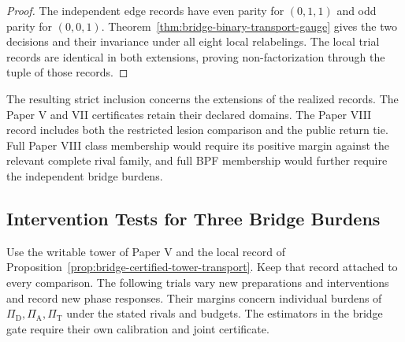 \documentclass[11pt,a4paper]{article}
\theoremstyle{definition}
\newcommand{\PiD}{\Pi_{\mathrm{D}}}
\newcommand{\PiA}{\Pi_{\mathrm{A}}}
\newcommand{\PiT}{\Pi_{\mathrm{T}}}
\begin{document}
\begin{proof}
The independent edge records have even parity for $(0,1,1)$ and odd parity for $(0,0,1)$. Theorem~\ref{thm:bridge-binary-transport-gauge} gives the two decisions and their invariance under all eight local relabelings. The local trial records are identical in both extensions, proving non-factorization through the tuple of those records.
\end{proof}

The resulting strict inclusion concerns the extensions of the realized records. The Paper V and VII certificates retain their declared domains. The Paper VIII record includes both the restricted lesion comparison and the public return tie. Full Paper VIII class membership would require its positive margin against the relevant complete rival family, and full BPF membership would further require the independent bridge burdens.

\subsection{Intervention Tests for Three Bridge Burdens}

Use the writable tower of Paper V and the local record of Proposition~\ref{prop:bridge-certified-tower-transport}. Keep that record attached to every comparison. The following trials vary new preparations and interventions and record new phase responses. Their margins concern individual burdens of $\PiD,\allowbreak \PiA,\allowbreak \PiT$ under the stated rivals and budgets. The estimators in the bridge gate require their own calibration and joint certificate.
\end{document}
